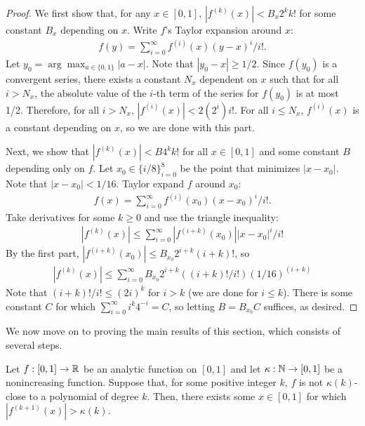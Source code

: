 \begin{proof}
We first show that, for any $x\in [0,1]$, $|f^{(k)}(x)| < B_x 2^k k!$ for some constant $B_x$ depending on $x$. Write $f$'s Taylor expansion around $x$:
\begin{align*}
f(y) = \sum_{i=0}^{\infty} f^{(i)}(x) (y - x)^i / i! .
\end{align*}
Let $y_0 = \arg \max_{a\in \{0,1\}} |a - x|$. Note that $|y_0 - x| \ge 1/2$. Since $f(y_0)$ is a convergent series, there exists a constant $N_x$ dependent on $x$ such that for all $i > N_x$, the absolute value of the $i$-th term of the series for $f(y_0)$ is at most 1/2. Therefore, for all $i > N_x$, $|f^{(i)}(x)| < 2(2^i) i!$. For all $i \le N_x$, $f^{(i)}(x)$ is a constant depending on $x$, so we are done with this part.

Next, we show that $|f^{(k)}(x)| < B 4^k k!$ for all $x\in [0,1]$ and some constant $B$ depending only on $f$. Let $x_0\in \{i/8\}_{i=0}^8$ be the point that minimizes $|x - x_0|$. Note that $|x - x_0| < 1/16$. Taylor expand $f$ around $x_0$:
\begin{align*}
f(x) = \sum_{i = 0}^{\infty} f^{(i)}(x_0) (x - x_0)^i / i! .
\end{align*}
Take derivatives for some $k \ge 0$ and use the triangle inequality:
\begin{align*}
|f^{(k)}(x)| \le \sum_{i = 0}^{\infty} |f^{(i+k)}(x_0)| |x - x_0|^i / i!
\end{align*}
By the first part, $|f^{(i+k)}(x_0)| \le B_{x_0} 2^{i+k} (i+k)!$, so
\begin{align*}
|f^{(k)}(x)| \le \sum_{i=0}^{\infty} B_{x_0} 2^{i+k} ((i+k)!/i!) (1/16)^{(i+k)}
\end{align*}
Note that $(i + k)!/i! \le (2i)^k$ for $i > k$ (we are done for $i \le k$). There is some constant $C$ for which $\sum_{i=0}^{\infty} i^k 4^{-i} = C$, so letting $B = B_{x_0} C$ suffices, as desired.
\end{proof}





We now move on to proving the main results of this section, which consists of several steps.


\begin{lemma}\label{lem:step1}
Let $f : [0,1] \to {\mathbb R}$ be an analytic function on $[0,1]$ and let $\kappa: {\mathbb N} \to [0,1]$ be a nonincreasing function. Suppose that, for some positive integer $k$, $f$ is not $\kappa(k)$-close to a polynomial of degree $k$.
Then, there exists some $x\in [0,1]$ for which $|f^{(k+1)}(x)| > \kappa(k)$.
\end{lemma}


